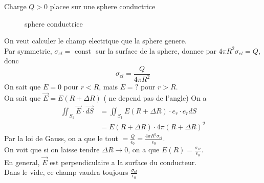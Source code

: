 \documentclass[../main.tex]{subfiles}
\begin{document}
\begin{exemple}
Charge $Q>0$ placee sur une sphere conductrice
\begin{figure}[H]
    \centering
    \caption{sphere conductrice}
    \label{fig:sphere-conductrice}
\end{figure}
\end{exemple}
On veut calculer le champ electrique que la sphere genere.\\
Par symmetrie, $\sigma_{el} = \text{ const } $ sur la surface de la sphere, donnee par $4 \pi R^{2} \sigma_{el} = Q$, donc
\[ 
\sigma_{el} = \frac{Q}{4 \pi R^{2}}
\]
On sait que $E=0$ pour $r<R$, mais $E = ?$ pour $r>R$.\\
On sait que $\vec{E} = E( R +\Delta R) $ ( ne depend pas de l'angle) 
On a
 \begin{align*}
	 \iint_{S_1}  \vec{E} \cdot \vec{dS} &=  \iint_{S_1}  E( R+ \Delta R) \cdot e_r \cdot e_r dS\\
					     &= E( R+ \Delta R ) \cdot 4 \pi ( R + \Delta R) ^{2}
\end{align*}
Par la loi de Gauss, on a que le tout $= \frac{Q}{\epsilon_0}= \frac{4 \pi R^{2}\sigma_{el} }{\epsilon_0}$.\\
On voit que si on laisse tendre $\Delta R \to 0$, on a que $E( R) =\frac{  \sigma_{el} }{\epsilon_0}$.\\
En general, $\vec{E}$ est perpendiculaire a la surface du conducteur.\\
Dans le vide, ce champ vaudra toujours $\frac{\sigma_{el} }{\epsilon_0}$ 
\end{document}
